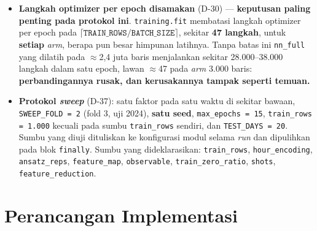 \begin{itemize}
          situ: 36 \textit{run} QNN (2 tahap $\times$ 2 domain $\times$ 3 fold
          $\times$ 3 seed) pada $\approx$18 menit masing-masing adalah
          $\approx$11 jam. \textbf{Lima seed tidak muat.} 4.000 baris $\times$ 30
          epoch menghabiskan $\approx$70\% seluruh anggaran.
    \item \textbf{Langkah optimizer per epoch disamakan} (D-30) ---
          \textbf{keputusan paling penting pada protokol ini}.
          \texttt{training.fit} membatasi langkah optimizer per epoch pada
          $\lceil \texttt{TRAIN\_ROWS}/\texttt{BATCH\_SIZE} \rceil$, sekitar
          \textbf{47 langkah}, untuk \textbf{setiap} \textit{arm}, berapa pun
          besar himpunan latihnya. Tanpa batas ini \texttt{nn\_full} yang dilatih
          pada $\approx$2,4 juta baris menjalankan sekitar 28.000--38.000 langkah
          dalam satu epoch, lawan $\approx$47 pada \textit{arm} 3.000 baris:
          \textbf{perbandingannya rusak, dan kerusakannya tampak seperti
          temuan.}
    \item \textbf{Protokol \textit{sweep}} (D-37): satu faktor pada satu waktu di
          sekitar bawaan, \texttt{SWEEP\_FOLD = 2} (fold 3, uji 2024),
          \textbf{satu seed}, \texttt{max\_epochs = 15},
          \texttt{train\_rows = 1.000} kecuali pada sumbu \texttt{train\_rows}
          sendiri, dan \texttt{TEST\_DAYS = 20}. Sumbu yang diuji dituliskan ke
          konfigurasi modul selama \textit{run} dan dipulihkan pada blok
          \texttt{finally}. Sumbu yang dideklarasikan: \texttt{train\_rows},
          \texttt{hour\_encoding}, \texttt{ansatz\_reps}, \texttt{feature\_map},
          \texttt{observable}, \texttt{train\_zero\_ratio}, \texttt{shots},
          \texttt{feature\_reduction}.
\end{itemize}

\section{Perancangan Implementasi}


